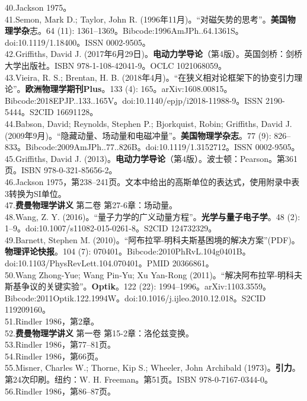 40.Jackson 1975。\\
41.Semon, Mark D.; Taylor, John R. (1996年11月)。“对磁矢势的思考”。\textbf{美国物理学杂}志。64 (11): 1361–1369。Bibcode:1996AmJPh..64.1361S。doi:10.1119/1.18400。ISSN 0002-9505。\\
42.Griffiths, David J. (2017年6月29日)。\textbf{电动力学导论}（第4版）。英国剑桥：剑桥大学出版社。ISBN 978-1-108-42041-9。OCLC 1021068059。\\
43.Vieira, R. S.; Brentan, H. B. (2018年4月)。“在狭义相对论框架下的协变引力理论”。\textbf{欧洲物理学期刊Plus}。133 (4): 165。arXiv:1608.00815。Bibcode:2018EPJP..133..165V。doi:10.1140/epjp/i2018-11988-9。ISSN 2190-5444。S2CID 16691128。\\
44.Babson, David; Reynolds, Stephen P.; Bjorkquist, Robin; Griffiths, David J. (2009年9月)。“隐藏动量、场动量和电磁冲量”。\textbf{美国物理学杂志}。77 (9): 826–833。Bibcode:2009AmJPh..77..826B。doi:10.1119/1.3152712。ISSN 0002-9505。\\
45.Griffiths, David J. (2013)。\textbf{电动力学导论}（第4版）。波士顿：Pearson。第361页。ISBN 978-0-321-85656-2。\\
46.Jackson 1975，第238–241页。文本中给出的高斯单位的表达式，使用附录中表3转换为SI单位。\\
47.\textbf{费曼物理学讲义} 第二卷 第27-6章：场动量。\\
48.Wang, Z. Y. (2016)。“量子力学的广义动量方程”。\textbf{光学与量子电子学}。48 (2): 1–9。doi:10.1007/s11082-015-0261-8。S2CID 124732329。\\
49.Barnett, Stephen M. (2010)。“阿布拉罕-明科夫斯基困境的解决方案”(PDF)。\textbf{物理评论快报}。104 (7): 070401。Bibcode:2010PhRvL.104g0401B。doi:10.1103/PhysRevLett.104.070401。PMID 20366861。\\
50.Wang Zhong-Yue; Wang Pin-Yu; Xu Yan-Rong (2011)。“解决阿布拉罕-明科夫斯基争议的关键实验”。\textbf{Optik}。122 (22): 1994–1996。arXiv:1103.3559。Bibcode:2011Optik.122.1994W。doi:10.1016/j.ijleo.2010.12.018。S2CID 119209160。\\
51.Rindler 1986，第2章。\\
52.\textbf{费曼物理学讲义} 第一卷 第15-2章：洛伦兹变换。\\
53.Rindler 1986，第77–81页。\\
54.Rindler 1986，第66页。\\
55.Misner, Charles W.; Thorne, Kip S.; Wheeler, John Archibald (1973)。\textbf{引力}。第24次印刷。纽约：W. H. Freeman。第51页。ISBN 978-0-7167-0344-0。\\
56.Rindler 1986，第86–87页。\\
